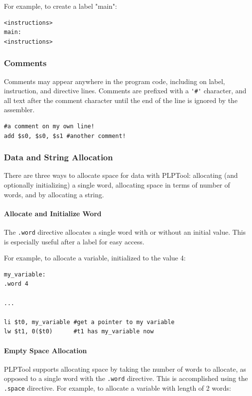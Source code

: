 \documentclass{article}
\begin{document}
For example, to create a label "main": 

\begin{verbatim}
<instructions>
main:
<instructions>
\end{verbatim}

\subsubsection{Comments}
Comments may appear anywhere in the program code, including on label, 
instruction, and directive lines. Comments are prefixed with a \verb+'#'+
character, and all text after the comment character until the end of the line is ignored by the assembler. 

\begin{verbatim}
#a comment on my own line!
add $s0, $s0, $s1 #another comment!
\end{verbatim}

\subsubsection{Data and String Allocation}
There are three ways to allocate space for data with PLPTool: allocating (and optionally initializing) a single word, allocating space in terms of number of words, and by allocating a string. 
\paragraph{Allocate and Initialize Word}
The \verb+.word+ directive allocates a single word with or without an initial 
value. This is especially useful after a label for easy access.

For example, to allocate a variable, initialized to the value 4: 

\begin{verbatim}
my_variable:
.word 4

...

li $t0, my_variable #get a pointer to my variable
lw $t1, 0($t0)      #t1 has my_variable now
\end{verbatim}

\paragraph{Empty Space Allocation}
PLPTool supports allocating space by taking the number of words to allocate, 
as opposed to a single word with the \verb+.word+ directive. This is 
accomplished using the \verb+.space+ directive. For example, to allocate a 
variable with length of 2 words: 
\end{document}
